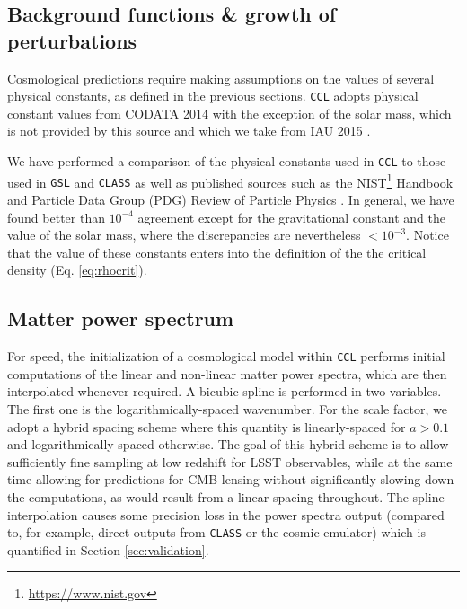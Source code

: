 \documentclass[\docopts]{\docclass}
\newcommand{\ccl}{{\tt CCL}\xspace}
\newcommand{\class}{{\tt CLASS}\xspace}
\begin{document}
\subsection{Background functions \& growth of perturbations}
\label{sec:distances}

Cosmological predictions require making assumptions on the values of several physical constants, as defined in the previous sections. \ccl adopts physical constant values from CODATA 2014 \citep{CODATA14} with the exception of the solar mass, which is not provided by this source and which we take from IAU 2015 \citep{IAU15}.

We have performed a comparison of the physical constants used in \ccl to those used in {\tt GSL} and \class as well as published sources such as the NIST\footnote{\url{https://www.nist.gov}} Handbook and Particle Data Group (PDG) Review of Particle Physics \citep{Beringer:1900zz}. In general, we have found better than $10^{-4}$ agreement except for the gravitational constant and the value of the solar mass, where the discrepancies are nevertheless $<10^{-3}$. Notice that the value of these constants enters into the definition of the the critical density (Eq. \ref{eq:rhocrit}). 


\subsection{Matter power spectrum}

For speed, the initialization of a cosmological model within \ccl performs initial computations of the linear and non-linear matter power spectra, which are then interpolated whenever required. A bicubic spline is performed in two variables. The first one is the logarithmically-spaced wavenumber. For the scale factor, we adopt a hybrid spacing scheme where this quantity is linearly-spaced for $a>0.1$ and logarithmically-spaced otherwise. The goal of this hybrid scheme is to allow sufficiently fine sampling at low redshift for LSST observables, while at the same time allowing for predictions for CMB lensing without significantly slowing down the computations, as would result from a linear-spacing throughout. The spline interpolation causes some precision loss in the power spectra output (compared to, for example, direct outputs from \class or the cosmic emulator) which is quantified in Section \ref{sec:validation}.
\end{document}
